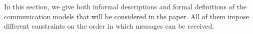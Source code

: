 
In this section, we give both informal descriptions and formal definitions of the communication models that will be considered in the paper. All of them impose different constraints on the order in which messages can be received.

%

